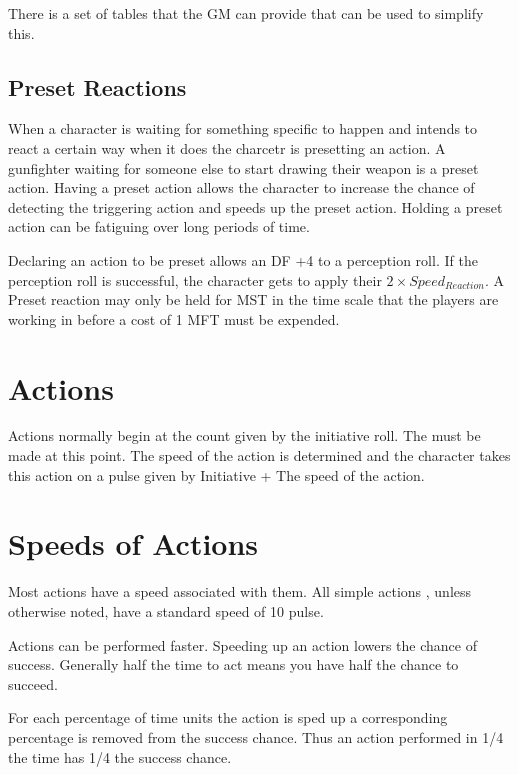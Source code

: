 There is a set of tables that the GM can provide that can be used to
simplify this. 

\subsection{{Preset Reactions}}

When a character is waiting for something specific to happen and intends to react a certain 
way when it does the charcetr is presetting an action. A gunfighter waiting for someone else 
to start drawing their weapon is a preset action. Having a preset action allows the character to increase
the chance of detecting the triggering action and speeds up the preset action. 
Holding a preset action can be fatiguing over long periods of time.

Declaring an action to be preset allows an DF +4 to a perception roll. If the perception roll is successful, the 
character gets to apply their $ 2 \times Speed_{Reaction} $. A Preset reaction may only be held for MST 
in the time scale that the players are working in before a cost of 1 MFT must be expended.

\section{{Actions}}

Actions normally begin at the count given by the initiative roll. The 
must be made at this point. The speed of the action is determined and 
the character takes this action on a pulse given by Initiative + The speed of the action.  

\section{Speeds of Actions}

Most actions have a speed associated with them. All simple actions
, unless otherwise noted, have a standard speed of 10 pulse. 




Actions can be performed faster. Speeding up an action lowers the
chance of success. Generally half the time to act means you have half the chance to succeed.

For each percentage of time units the action is sped up a corresponding percentage is removed from 
the success chance. Thus an action performed in 1/4 the time has 1/4 the success chance.

